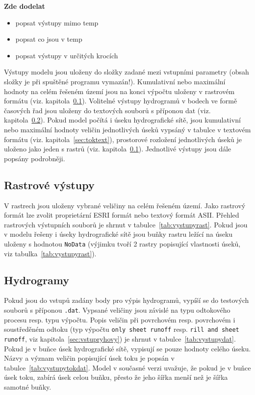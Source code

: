 \textbf{Zde dodelat}
\begin{itemize}
  \item popsat výstupy mimo temp
  \item popsat co jsou v temp
  \item popsat výstupy v určitých krocích
\end{itemize}

Výstupy modelu jsou uloženy do složky zadané mezi vstupními parametry (obsah složky je při spuštěné programu vymazán!). Kumulativní nebo maximální hodnoty na celém řešeném území jsou na konci výpočtu uloženy v rastrovém formátu (viz. kapitola~\ref{sec:rastr}). Volitelné výstupy hydrogramů v bodech ve formě časových řad jsou uloženy do textových souborů s příponou dat (viz. kapitola~\ref{sec:hydrogramy}). Pokud model počítá i úseku hydrografické sítě, jsou kumulativní nebo maximální hodnoty veličin jednotlivých úseků vypsáný v tabulce v textovém formátu (viz. kapitola~\ref{sec:toktext}), prostorové rozložení jednotlivých úseků je uloženo jako jeden s rastrů (viz. kapitola~\ref{sec:rastr}). Jednotlivé výstupy jsou dále popsány podrobněji. 



\subsection{Rastrové výstupy}\label{sec:rastr}

V rastrech jsou uloženy vybrané veličiny na celém řešeném území. Jako rastrový formát lze zvolit proprietární ESRI formát nebo textový formát ASII. Přehled rastrových výstupních souborů je shrnut v tabulce~\ref{tab:vystupyrast}. Pokud jsou v modelu řešeny i úseky hydrografické sítě jsou buňky rastru ležící na úseku uloženy s hodnotou {\tt NoData} (výjimku tvoří 2 rastry popisující vlastnosti úseků, viz tabulka~\ref{tab:vystupyrast}).  





\subsection{Hydrogramy}\label{sec:hydrogramy}

Pokud jsou do vstupů zadány body pro výpis hydrogramů, vypíší se do testových souborů s příponou {\tt.dat}. Vypsané veličiny jsou závislé na typu odtokového procesu resp. typu výpočtu. Popis veličin při povrchovém resp. povrchovém i soustředěném odtoku (typ výpočtu {\tt only sheet runoff} resp. {\tt rill and sheet runoff}, viz kapitola~\ref{sec:vstupryhovy}) je shrnut v tabulce~\ref{tab:vystupydat}. Pokud je v buňce úsek hydrografické sítě, vypisují se pouze hodnoty celého úseku. Názvy a význam veličin popisující úsek toku je popsán v tabulce~\ref{tab:vystupytokdat}. Model v současné verzi uvažuje, že pokud je v buňce úsek toku, zabírá úsek celou buňku, přesto že jeho šířka menší než je šířka samotné buňky.  



